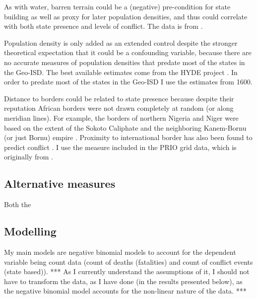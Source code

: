 \documentclass[12pt]{article}
\begin{document}
As with water, barren terrain could be a (negative) pre-condition for state
building as well as proxy for later population densities, and thus could
correlate with both state presence and levels of conflict. The data is from
\citet{Bontemps2009}.

Population density is only added as an extended control despite the stronger
theoretical expectation that it could be a confounding variable, because there
are no accurate measures of population densities that predate most of the
states in the Geo-ISD. The best available estimates come from the HYDE project
\citep{Goldewijk2016}. In order to predate most of the states in the Geo-ISD I
use the estimates from 1600.


Distance to borders could be related to state presence because despite their
reputation African borders were not drawn completely at random (or along
meridian lines). For example, the borders of northern Nigeria and Niger were
based on the extent of the Sokoto Caliphate and the neighboring Kanem-Bornu (or
just Bornu) empire \citep{HiribarrenVincent2017AHoB}. Proximity to international
border has also been found to predict conflict \citep{Buhaug2002}. I use the
measure included in the PRIO grid data, which is originally from
\citet{Weidmann2010a}.

\subsection{Alternative measures}

Both the 

\subsection{Modelling}

My main models are negative binomial models to account for the dependent
variable being count data (count of deaths (fatalities) and count of conflict
events (state based)). *** As I currently understand the assumptions of it, I
should not have to transform the data, as I have done (in the results presented
below), as the negative binomial model accounts for the non-linear nature of the
data. ***
\end{document}
